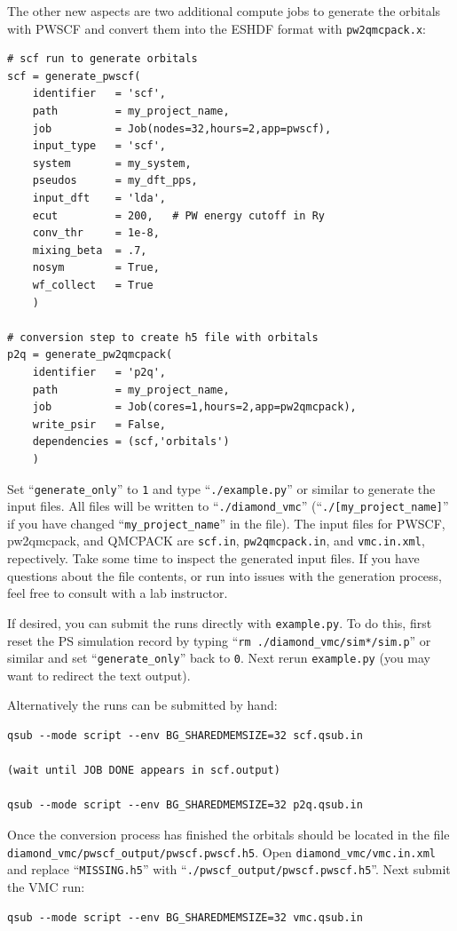 The other new aspects are two additional compute jobs to generate the orbitals with PWSCF and convert them into the ESHDF format with \texttt{pw2qmcpack.x}:

\begin{shaded}
\begin{verbatim}
# scf run to generate orbitals
scf = generate_pwscf(
    identifier   = 'scf',
    path         = my_project_name,
    job          = Job(nodes=32,hours=2,app=pwscf),
    input_type   = 'scf',
    system       = my_system,
    pseudos      = my_dft_pps,
    input_dft    = 'lda', 
    ecut         = 200,   # PW energy cutoff in Ry
    conv_thr     = 1e-8, 
    mixing_beta  = .7,
    nosym        = True,
    wf_collect   = True
    )

# conversion step to create h5 file with orbitals
p2q = generate_pw2qmcpack(
    identifier   = 'p2q',
    path         = my_project_name,
    job          = Job(cores=1,hours=2,app=pw2qmcpack),
    write_psir   = False,
    dependencies = (scf,'orbitals')
    )
\end{verbatim}
\end{shaded}

Set ``\texttt{generate\_only}'' to \texttt{1} and type ``\texttt{./example.py}'' or similar to generate the input files.  All files will be written to ``\texttt{./diamond\_vmc}'' (``\texttt{./[my\_project\_name]}'' if you have changed ``\texttt{my\_project\_name}'' in the file).  The input files for PWSCF, pw2qmcpack, and QMCPACK are \texttt{scf.in}, \texttt{pw2qmcpack.in}, and \texttt{vmc.in.xml}, repectively.  Take some time to inspect the generated input files.  If you have questions about the file contents, or run into issues with the generation process, feel free to consult with a lab instructor.  

If desired, you can submit the runs directly with \texttt{example.py}.  To do this, first reset the PS simulation record by typing ``\texttt{rm ./diamond\_vmc/sim*/sim.p}'' or similar and set ``\texttt{generate\_only}'' back to \texttt{0}.  Next rerun \texttt{example.py}  (you may want to redirect the text output).  

Alternatively the runs can be submitted by hand:
\begin{shaded}
\begin{verbatim}
qsub --mode script --env BG_SHAREDMEMSIZE=32 scf.qsub.in

(wait until JOB DONE appears in scf.output)

qsub --mode script --env BG_SHAREDMEMSIZE=32 p2q.qsub.in
\end{verbatim}
\end{shaded}
Once the conversion process has finished the orbitals should be located in the file \texttt{diamond\_vmc/pwscf\_output/pwscf.pwscf.h5}.  Open \texttt{diamond\_vmc/vmc.in.xml} and replace ``\texttt{MISSING.h5}'' with ``\texttt{./pwscf\_output/pwscf.pwscf.h5}''.  Next submit the VMC run:
\begin{shaded}
\begin{verbatim}
qsub --mode script --env BG_SHAREDMEMSIZE=32 vmc.qsub.in
\end{verbatim}
\end{shaded}


